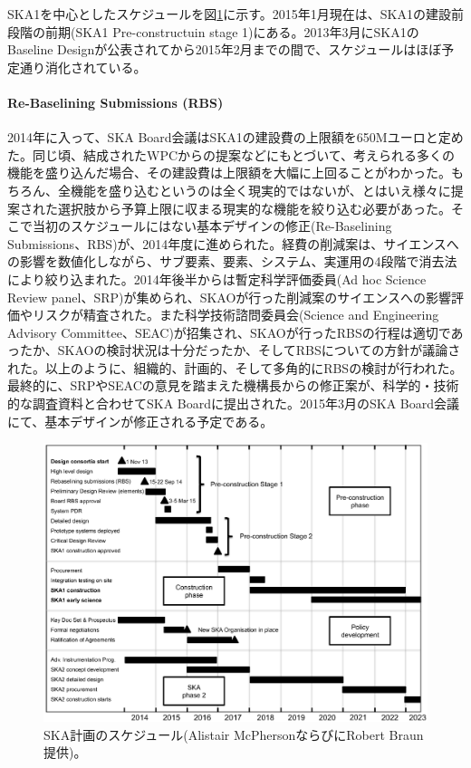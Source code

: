 SKA1を中心としたスケジュールを図\ref{c01.s2.f1}に示す。2015年1月現在は、SKA1の建設前段階の前期(SKA1 Pre-constructuin stage 1)にある。2013年3月にSKA1のBaseline Designが公表されてから2015年2月までの間で、スケジュールはほぼ予定通り消化されている。

\paragraph{Re-Baselining Submissions (RBS)}

2014年に入って、SKA Board会議はSKA1の建設費の上限額を650Mユーロと定めた。同じ頃、結成されたWPCからの提案などにもとづいて、考えられる多くの機能を盛り込んだ場合、その建設費は上限額を大幅に上回ることがわかった。もちろん、全機能を盛り込むというのは全く現実的ではないが、とはいえ様々に提案された選択肢から予算上限に収まる現実的な機能を絞り込む必要があった。そこで当初のスケジュールにはない基本デザインの修正(Re-Baselining Submissions、RBS)が、2014年度に進められた。経費の削減案は、サイエンスへの影響を数値化しながら、サブ要素、要素、システム、実運用の4段階で消去法により絞り込まれた。2014年後半からは暫定科学評価委員(Ad hoc Science Review panel、SRP)が集められ、SKAOが行った削減案のサイエンスへの影響評価やリスクが精査された。また科学技術諮問委員会(Science and Engineering Advisory Committee、SEAC)が招集され、SKAOが行ったRBSの行程は適切であったか、SKAOの検討状況は十分だったか、そしてRBSについての方針が議論された。以上のように、組織的、計画的、そして多角的にRBSの検討が行われた。最終的に、SRPやSEACの意見を踏まえた機構長からの修正案が、科学的・技術的な調査資料と合わせてSKA Boardに提出された。2015年3月のSKA Board会議にて、基本デザインが修正される予定である。

\begin{figure}[tbp]
\begin{center}
\includegraphics[width=\linewidth]{introduction/c01.s2.f1.eps}
\caption{SKA計画のスケジュール(Alistair McPhersonならびにRobert Braun提供)。}\label{c01.s2.f1}
\end{center}
\end{figure}

